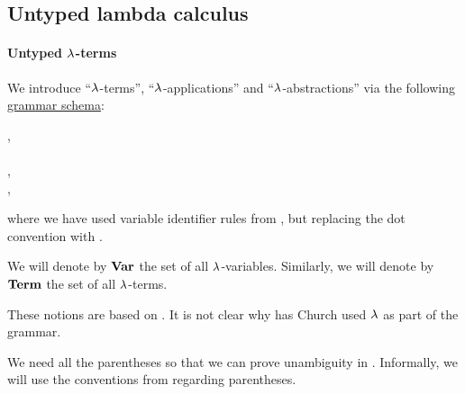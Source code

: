 \subsection{Untyped lambda calculus}\label{subsec:untyped_lambda_calculus}

\paragraph{Untyped \( \synlambda \)-terms}

\begin{definition}\label{def:untyped_lambda_term}\mimprovised
  We introduce \enquote{\( \synlambda \)-terms}, \enquote{\( \synlambda \)-applications} and \enquote{\( \synlambda \)-abstractions} via the following \hyperref[def:formal_grammar/schema]{grammar schema}:
  \begin{bnf*}
        {}, \\
     {\bnftsq{\( ( \)} \bnfsp {} \bnfsp {} \bnfsp \bnftsq{\( ) \)}} \\
     {\bnftsq{\( ( \)} \bnfsp \bnftsq{\( \synlambda \)} \bnfsp {} \bnfsp {} \bnfsp {} \bnfsp \bnftsq{\( ) \)}}, \\
            { \bnfor {} \bnfor {}},
  \end{bnf*}
  where we have used variable identifier rules from , but replacing the dot convention with .

  \begin{thmenum}
     We will denote by \( \op*{Var} \) the set of all \( \synlambda \)-variables.
     Similarly, we will denote by \( \op*{Term} \) the set of all \( \synlambda \)-terms.
  \end{thmenum}
\end{definition}
\begin{comments}
  \item These notions are based on \cite[352]{Church1932}. It is not clear why has Church used \( \synlambda \) as part of the grammar.

  \item We need all the parentheses so that we can prove unambiguity in . Informally, we will use the conventions from  regarding parentheses.
\end{comments}


